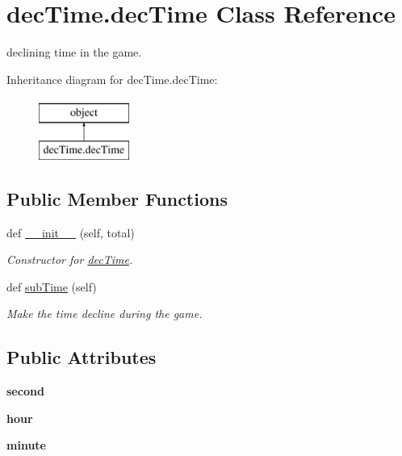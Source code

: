 \hypertarget{classdec_time_1_1dec_time}{}\section{dec\+Time.\+dec\+Time Class Reference}
\label{classdec_time_1_1dec_time}


declining time in the game.  


Inheritance diagram for dec\+Time.\+dec\+Time\+:\begin{figure}[H]
\begin{center}
\leavevmode
\includegraphics[height=2.000000cm]{classdec_time_1_1dec_time}
\end{center}
\end{figure}
\subsection*{Public Member Functions}
\begin{DoxyCompactItemize}
\item 
def \mbox{\hyperlink{classdec_time_1_1dec_time_a347077af854df5ad2e55078cab68c0cd}{\+\_\+\+\_\+init\+\_\+\+\_\+}} (self, total)
\begin{DoxyCompactList}\small\item\em Constructor for \mbox{\hyperlink{classdec_time_1_1dec_time}{dec\+Time}}. \end{DoxyCompactList}\item 
def \mbox{\hyperlink{classdec_time_1_1dec_time_abc74b9f7ad93fd128906664aedc18979}{sub\+Time}} (self)
\begin{DoxyCompactList}\small\item\em Make the time decline during the game. \end{DoxyCompactList}\end{DoxyCompactItemize}
\subsection*{Public Attributes}
\begin{DoxyCompactItemize}
\item 
\mbox{\label{classdec_time_1_1dec_time_a712a9bc7e0229d855831f4d39d456246}} 
{\bfseries second}
\item 
\mbox{\label{classdec_time_1_1dec_time_abc6db2a2eb048e05367533a2a03dcc0d}} 
{\bfseries hour}
\item 
\mbox{\label{classdec_time_1_1dec_time_a954e2cc6939da44283c8afa07275c8b5}} 
{\bfseries minute}
\end{DoxyCompactItemize}


